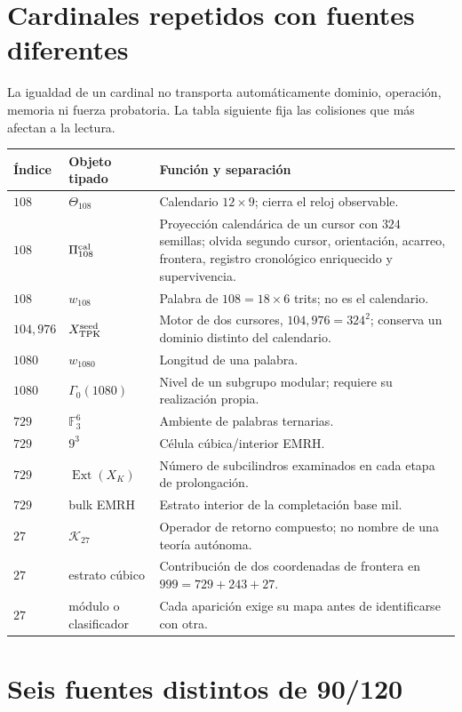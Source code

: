 \section*{Cardinales repetidos con fuentes diferentes}

La igualdad de un cardinal no transporta automáticamente dominio,
operación, memoria ni fuerza probatoria. La tabla siguiente fija las
colisiones que más afectan a la lectura.

\begin{longtable}{@{}p{}p{}p{}@{}}
\toprule
Índice & Objeto tipado & Función y separación \\ \midrule
\endhead
\(108\)&\(\Theta_{108}\)&Calendario \(12\times9\); cierra el reloj
observable.\\
\(108\)&\(\Pi_{108}^{\rm cal}\)&Proyección calendárica de un cursor con \(324\)
semillas; olvida segundo cursor, orientación, acarreo, frontera, registro
cronológico enriquecido y
supervivencia.\\
\(108\)&\(w_{108}\)&Palabra de \(108=18\times6\) trits; no es el calendario.\\
\(104,976\)&\(X_{\rm TPK}^{\rm seed}\)&Motor de dos cursores,
\(104,976=324^2\); conserva un dominio distinto del calendario.\\
\(1080\)&\(w_{1080}\)&Longitud de una palabra.\\
\(1080\)&\(\Gamma_0(1080)\)&Nivel de un subgrupo modular; requiere su
realización propia.\\
\(729\)&\(\mathbb F_3^6\)&Ambiente de palabras ternarias.\\
\(729\)&\(9^3\)&Célula cúbica/interior EMRH.\\
\(729\)&\(\operatorname{Ext}(X_K)\)&Número de subcilindros examinados en cada
etapa de prolongación.\\
\(729\)&bulk EMRH&Estrato interior de la completación base mil.\\
\(27\)&\(\mathcal K_{27}\)&Operador de retorno compuesto; no nombre de una
teoría autónoma.\\
\(27\)&estrato cúbico&Contribución de dos coordenadas de frontera en
\(999=729+243+27\).\\
\(27\)&módulo o clasificador&Cada aparición exige su mapa antes de
identificarse con otra.\\
\bottomrule
\end{longtable}

\section*{Seis fuentes distintos de 90/120}


